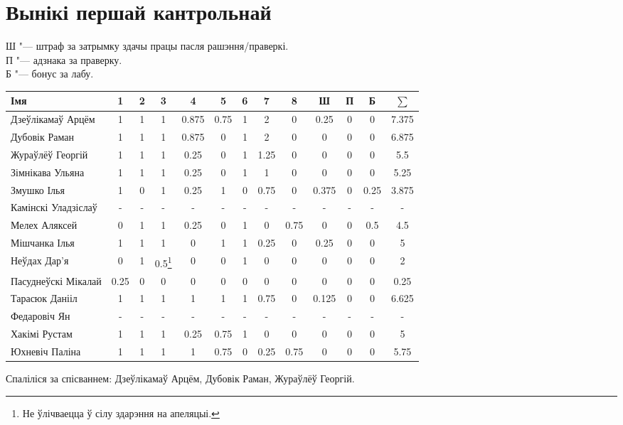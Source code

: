 

\renewcommand\thempfootnote{\arabic{mpfootnote}}


	\section{Вынікі першай кантрольнай}
	\noindent Ш "--- штраф за затрымку здачы працы пасля рашэння/праверкі. \\
	П "--- адзнака за праверку. \\
	Б "--- бонус за лабу.
\begin{table}[H]
	\begin{minipage}{\textwidth}
		\begin{tabular}{|l|c|c|c|c|c|c|c|c|c|c|c|c|}
			\hline
			Імя                 & 1 & 2   & 3   & 4    & 5    & 6 & 7   & 8    & Ш   & П    & Б    & $\sum$ \\ \hline
			Дзеўлікамаў Арцём & 1 & 1 & 1 & 0.875 & 0.75 & 1 & 2 & 0 & 0.25 & 0 & 0 & 7.375 \\ \hline
			Дубовік Раман & 1 & 1 & 1 & 0.875 & 0 & 1 & 2 & 0 & 0 & 0 & 0 & 6.875 \\ \hline
			Жураўлёў Георгій & 1 & 1 & 1 & 0.25 & 0 & 1 & 1.25 & 0 & 0 & 0 & 0 & 5.5 \\ \hline
			Зімнікава Ульяна & 1 & 1 & 1  & 0.25 & 0 & 1 & 1 & 0 & 0 & 0 &  0 & 5.25 \\ \hline
			Змушко Ілья & 1 & 0 & 1 & 0.25 & 1 & 0 & 0.75 & 0 & 0.375 & 0 & 0.25 & 3.875 \\ \hline
			Камінскі Уладзіслаў & - & - & - & - & - & - & - & - & - & - & - & - \\ \hline
			Мелех Аляксей & 0 & 1 & 1 & 0.25 & 0 & 1 & 0 & 0.75 & 0 & 0 & 0.5 & 4.5 \\ \hline
			Мішчанка Ілья & 1 & 1 & 1 & 0 & 1 & 1 & 0.25 & 0 & 0.25 & 0 & 0 & 5 \\ \hline
			Неўдах Дар'я & 0 & 1 & 0.5\footnote{Не ўлічваецца ў сілу здарэння на апеляцыі.} & 0 & 0 & 1 & 0 & 0 & 0 & 0 & 0 & 2 \\ \hline
			Пасуднеўскі Мікалай & 0.25 & 0 & 0 & 0 & 0 & 0 & 0 & 0 & 0 & 0 & 0 & 0.25 \\ \hline
			Тарасюк Данііл & 1 & 1 & 1 & 1 & 1 & 1 & 0.75 & 0 & 0.125 & 0 & 0 & 6.625 \\ \hline
			Федаровіч Ян & - & - & - & - & - & - & - & - & - & - & - & - \\ \hline
			Хакімі Рустам & 1 & 1 & 1 & 0.25 & 0.75 & 1 & 0 & 0 & 0 & 0 & 0 & 5 \\ \hline
			Юхневіч Паліна & 1 & 1 & 1 & 1 & 0.75 & 0 & 0.25 & 0.75 & 0 & 0 & 0 & 5.75 \\ \hline
		\end{tabular}
	\end{minipage}
\end{table}

\noindent Спаліліся за спісваннем: Дзеўлікамаў Арцём, Дубовік Раман, Жураўлёў Георгій.


